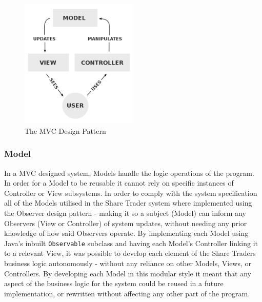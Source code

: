 \documentclass[12pt, a4paper,titlepage]{article}
\begin{document}
\begin{figure}[]
    \begin{center}
        \includegraphics[width = 0.5\textwidth]{./res/mvc.png}
        \caption[The MVC Design Pattern]{The MVC Design Pattern 
        \footnotemark} 
        \label{fig_mvc}
    \end{center}
\end{figure}

\subsubsection{Model}
In a MVC designed system, Models handle the logic operations of the program.
In order for a Model to be reusable it cannot rely on specific instances of
Controller or View subsystems. 
In order to comply with the system specification all of the Models utilised in
the Share Trader system where implemented using the Observer design pattern -
making it so a subject (Model) can inform any Observers (View or Controller)
of system updates, without needing any prior knowledge of how said Observers
operate.  
By implementing each Model using Java’s inbuilt {\tt Observable} subclass and
having each Model’s Controller linking it to a relevant View, it was possible
to develop each element of the Share Traders business logic autonomously -
without any reliance on other Models, Views, or Controllers.
By developing each Model in this modular style it meant that any aspect of the
business logic for the system could be reused in a future implementation, or
rewritten without affecting any other part of the program.
\end{document}

